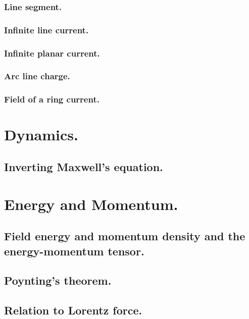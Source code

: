          \subsubsection{Line segment.}
            
         \subsubsection{Infinite line current.}
            
         \subsubsection{Infinite planar current.}
            
         \subsubsection{Arc line charge.}
            
         \subsubsection{Field of a ring current.}
            
      \section{Dynamics.}
         \subsection{Inverting Maxwell's equation.}
            
      \section{Energy and Momentum.}
         \subsection{Field energy and momentum density and the energy-momentum tensor.}
            
         \subsection{Poynting's theorem.}
            
         \subsection{Relation to Lorentz force.}
            
